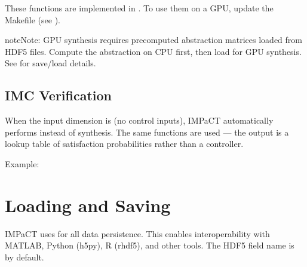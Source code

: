 \documentclass[a4paper,10pt,english]{sphinxmanual}
\begin{document}
\sphinxAtStartPar
These functions are implemented in . To use them on a GPU,
update the Makefile (see {\hyperref[\detokenize{getting-started/gpu::doc}]{}}).

\begin{sphinxadmonition}{note}{Note:}
\sphinxAtStartPar
GPU synthesis requires pre\sphinxhyphen{}computed abstraction matrices loaded from HDF5 files.
Compute the abstraction on CPU first, then load for GPU synthesis.
See {\hyperref[\detokenize{user-guide/io::doc}]{}} for save/load details.
\end{sphinxadmonition}


\subsection{IMC Verification}
\label{\detokenize{user-guide/synthesis:imc-verification}}
\sphinxAtStartPar
When the input dimension is  (no control inputs), IMPaCT automatically
performs  instead of synthesis. The same functions are used —
the output is a lookup table of satisfaction probabilities rather than a controller.

\sphinxAtStartPar
Example:

\begin{sphinxVerbatim}[commandchars=\\\{\}]
\end{sphinxVerbatim}

\sphinxstepscope


\section{Loading and Saving}
\label{\detokenize{user-guide/io:loading-and-saving}}\label{\detokenize{user-guide/io::doc}}
\sphinxAtStartPar
IMPaCT uses  for all data
persistence. This enables interoperability with MATLAB, Python (h5py), R (rhdf5),
and other tools. The HDF5 field name is  by default.
\end{document}
